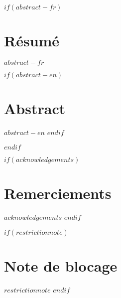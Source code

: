 
\renewcommand{\contentsname}{Table des matières}

$if(abstract-fr)$
\cleardoublepage
\begin{minipage}{\linewidth}

\chapter*{Résumé}
$abstract-fr$

$if(abstract-en)$
\chapter*{Abstract}
$abstract-en$
$endif$

\end{minipage}
\cleardoublepage
$endif$

$if(acknowledgements)$
\chapter*{Remerciements}
$acknowledgements$
$endif$



$if(restrictionnote)$
\chapter*{Note de blocage}
$restrictionnote$
$endif$



\cleardoublepage
